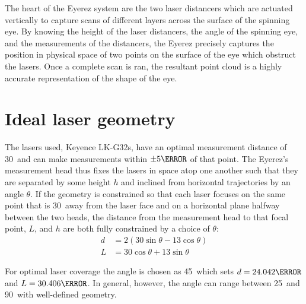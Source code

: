 

The heart of the Eyerez system are the two laser distancers which are
actuated vertically to capture scans of different layers across the
surface of the spinning eye. By knowing the height of the laser
distancers, the angle of the spinning eye, and the measurements of the
distancers, the Eyerez precisely captures the position in physical
space of two points on the surface of the eye which obstruct the
lasers. Once a complete scan is ran, the resultant point cloud is a
highly accurate representation of the shape of the eye.


\section{Ideal laser geometry}
\label{sec:laser-geometry}

The lasers used, Keyence LK-G32s, have an optimal measurement distance
of 30\mm\ and can make measurements within $\pm5 \mm$ of that
point. The Eyerez's measurement head thus fixes the lasers in space
atop one another such that they are separated by some height $h$ and
inclined from horizontal trajectories by an angle $\theta$. If the
geometry is constrained so that each laser focuses on the same point
that is 30\mm\ away from the laser face and on a horizontal plane
halfway between the two heads, the distance from the measurement head
to that focal point, $L$, and $h$ are both fully constrained by a
choice of $\theta$:
\begin{align}
  d &= 2\left(30 \sin\theta - 13\cos\theta\right) \\
  L &= 30 \cos\theta + 13 \sin\theta
\end{align}

For optimal laser coverage the angle is chosen as 45\degrees\ which
sets $d = 24.042\mm$ and $L = 30.406\mm$. In general, however, the
angle can range between 25\degrees\ and 90\degrees\ with well-defined
geometry. 

